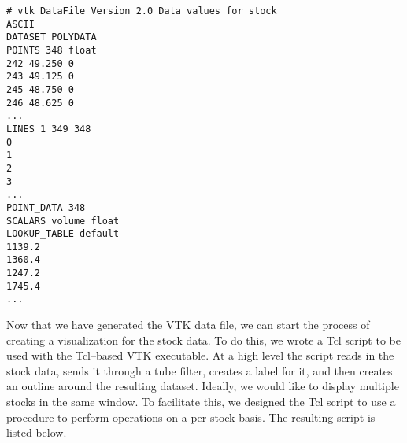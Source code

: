 \begin{lstlisting}[numbers=none]
# vtk DataFile Version 2.0 Data values for stock
ASCII
DATASET POLYDATA
POINTS 348 float
242 49.250 0
243 49.125 0
245 48.750 0
246 48.625 0
...
LINES 1 349 348
0
1
2
3
...
POINT_DATA 348
SCALARS volume float
LOOKUP_TABLE default
1139.2
1360.4
1247.2
1745.4
...
\end{lstlisting}

Now that we have generated the VTK data file, we can start the process of creating a visualization for the stock data. To do this, we wrote a Tcl script to be used with the Tcl--based VTK executable. At a high level the script reads in the stock data, sends it through a tube filter, creates a label for it, and then creates an outline around the resulting dataset. Ideally, we would like to display multiple stocks in the same window. To facilitate this, we designed the Tcl script to use a procedure to perform operations on a per stock basis. The resulting script is listed below.


